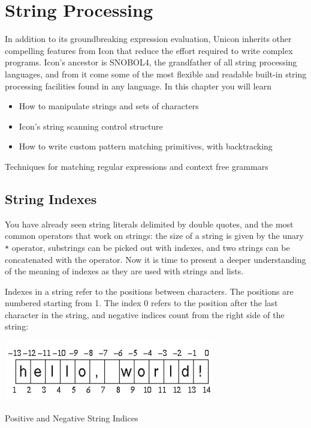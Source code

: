 \chapter{String Processing}

In addition to its groundbreaking expression evaluation, Unicon inherits
other compelling features from Icon that reduce the effort required to
write complex programs. Icon's ancestor is
SNOBOL4, the grandfather of all string processing
languages, and from it come some of the most flexible and readable
built-in string processing facilities found in any language. In this
chapter you will learn

\begin{itemize}
\item How to manipulate strings and sets of characters
\item Icon's string scanning control structure
\item How to write custom pattern matching
primitives, with backtracking
\end{itemize}
Techniques for matching regular expressions and context free grammars

\section{String Indexes}

You have already seen string literals delimited by double quotes, and
the most common operators that work on strings: the size of a string is
given by the unary \texttt{*} operator, substrings can be picked out
with indexes, and two strings can be concatenated with the
\texttt{{\textbar}{\textbar}} operator. Now it is time to present a
deeper understanding of the meaning of indexes as they are used with
strings and lists.

Indexes in a string refer to the positions
between characters. The positions are numbered starting from 1. The
index 0 refers to the position after the last character in the string,
and negative indices count from the right side of the string:


\begin{center}
\includegraphics[width=3.6075in,height=1.0417in]{ub-img/ub-img7.png}
\end{center}
\vspace{-0.25cm}{\sffamily\bfseries Figure 3-1:}
{\sffamily Positive and Negative String Indices}

